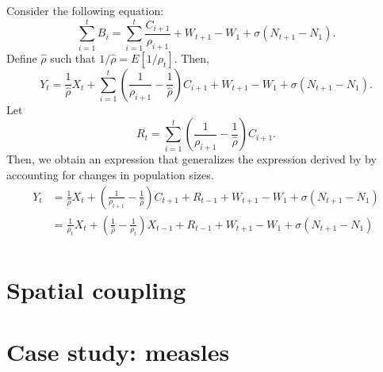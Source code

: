 \documentclass{article}
\begin{document}
Consider the following equation:
\begin{equation}
\sum_{i=1}^t B_i = \sum_{i=1}^t \frac{C_{i+1}}{\rho_{i+1}} + W_{t+1} - W_1 + \sigma (N_{t+1} - N_1).
\end{equation}
Define $\hat{\rho}$ such that $1/\hat{\rho} = E[1/\rho_t]$.
Then,
\begin{equation}
Y_t = \frac{1}{\hat{\rho}} X_t + \sum_{i=1}^t \left(\frac{1}{\rho_{i+1}} - \frac{1}{\hat{\rho}}\right) C_{i+1} + W_{t+1} - W_1 + \sigma (N_{t+1} - N_1).
\end{equation}
Let 
$$
R_t =  \sum_{i=1}^t \left(\frac{1}{\rho_{i+1}} - \frac{1}{\hat{\rho}}\right) C_{i+1}.
$$
Then, we obtain an expression that generalizes the expression derived by \cite{finkenstadt2000time} by accounting for changes in population sizes.
\begin{equation}
\begin{aligned}
Y_t &= \frac{1}{\hat{\rho}} X_t + \left(\frac{1}{\rho_{t+1}} - \frac{1}{\hat{\rho}}\right) C_{t+1} + R_{t-1} + W_{t+1} - W_1 + \sigma (N_{t+1} - N_1)\\
&= \frac{1}{\rho_t} X_t + \left(\frac{1}{\hat{\rho}}  - \frac{1}{\rho_t} \right) X_{t-1} + R_{t-1} + W_{t+1} - W_1 + \sigma (N_{t+1} - N_1)\\
\end{aligned}
\end{equation}




\section{Spatial coupling}

\section{Case study: measles}



\end{document}
